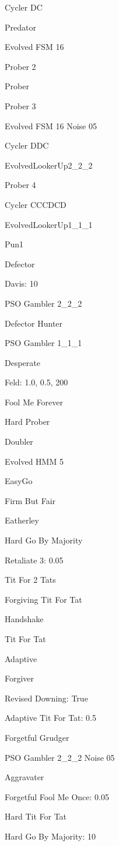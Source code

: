 \item Cycler DC
\item Predator
\item Evolved FSM 16
\item Prober 2
\item Prober
\item Prober 3
\item Evolved FSM 16 Noise 05
\item Cycler DDC
\item EvolvedLookerUp2\_2\_2
\item Prober 4
\item Cycler CCCDCD
\item EvolvedLookerUp1\_1\_1
\item Pun1
\item Defector
\item Davis: 10
\item PSO Gambler 2\_2\_2
\item Defector Hunter
\item PSO Gambler 1\_1\_1
\item Desperate
\item Feld: 1.0, 0.5, 200
\item Fool Me Forever
\item Hard Prober
\item Doubler
\item Evolved HMM 5
\item EasyGo
\item Firm But Fair
\item Eatherley
\item Hard Go By Majority
\item Retaliate 3: 0.05
\item Tit For 2 Tats
\item Forgiving Tit For Tat
\item Handshake
\item Tit For Tat
\item Adaptive
\item Forgiver
\item Revised Downing: True
\item Adaptive Tit For Tat: 0.5
\item Forgetful Grudger
\item PSO Gambler 2\_2\_2 Noise 05
\item Aggravater
\item Forgetful Fool Me Once: 0.05
\item Hard Tit For Tat
\item Hard Go By Majority: 10
